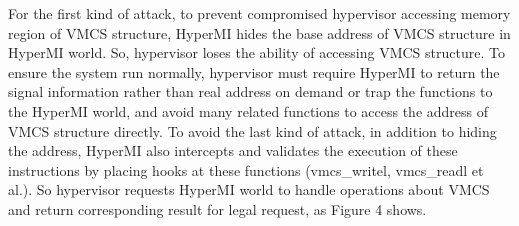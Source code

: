 \documentclass[conference]{IEEEtran}
\begin{document}
For the first kind of attack, to prevent compromised hypervisor accessing memory region of VMCS structure, HyperMI hides the base address of VMCS structure in HyperMI world. So, hypervisor loses the ability of accessing VMCS structure. To ensure the system run normally, hypervisor must require HyperMI to return the signal information rather than real address on demand or trap the functions to the HyperMI world, and avoid many related functions to access the address of VMCS structure directly. To avoid the last kind of attack, in addition to hiding the address, HyperMI also intercepts and validates the execution of these instructions by placing hooks at these functions (vmcs\_writel, vmcs\_readl et al.). So hypervisor requests HyperMI world to handle operations about VMCS and return corresponding result for legal request, as Figure 4 shows.
\end{document}
